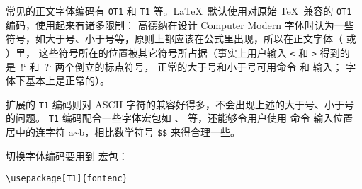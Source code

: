 常见的正文字体编码有 \texttt{OT1} 和 \texttt{T1} 等。\LaTeX\ 默认使用对原始 \TeX\ 兼容的 \texttt{OT1} 编码，使用起来有诸多限制：
高德纳在设计 Computer Modern 字体时认为一些符号，如大于号、小于号等，原则上都应该在公式里出现，所以在正文字体（ 或 ）里，
这些符号所在的位置被其它符号所占据（事实上用户输入 \texttt< 和 \texttt> 得到的是\ !` 和\ ?` 两个倒立的标点符号，
正常的大于号和小于号可用命令  和  输入； 字体下基本上是正常的）。

扩展的 \texttt{T1} 编码则对 ASCII 字符的兼容好得多，不会出现上述的大于号、小于号的问题。
\texttt{T1} 编码配合一些字体宏包如 、 等，还能够令用户使用  命令
输入位置居中的连字符 a\textasciitilde b，相比数学符号 \texttt\$\texttt\$ 来得合理一些。

切换字体编码要用到  宏包：
\begin{verbatim}
\usepackage[T1]{fontenc}
\end{verbatim}

